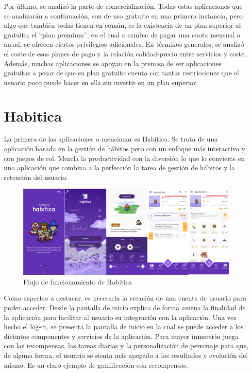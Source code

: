 Por último, se analizó la parte de comercialización. Todas estas aplicaciones que se analizarán a continuación, son de uso gratuito en una primera instancia, pero algo que también todas tienen en común, es la existencia de un plan superior al gratuito, el ``plan premium'',  en el cual a cambio de pagar una cuota mensual o anual, se ofrecen ciertos privilegios adicionales. En términos generales, se analizó el coste de esos planes de pago  y la relación calidad-precio entre servicios y coste. Además, muchas aplicaciones se apoyan en la premisa de ser aplicaciones gratuitas a pesar de que su plan gratuito cuenta con tantas restricciones que el usuario poco puede hacer en ella sin invertir en un plan superior.

\section{Habitica}

La primera de las aplicaciones a mencionar es Habitica. Se trata de una aplicación basada en la gestión de hábitos pero con un enfoque más interactivo y con juegos de rol. Mezcla la productividad con la diversión lo que lo convierte en una aplicación que combina a la perfección la tarea de gestión de hábitos y la retención del usuario.

\begin{figure}[h]
	\centering
	\includegraphics[width = 1\textwidth]{Imagenes/apps_images/habitica.png}
	\caption{Flujo de funcionamiento de Habitica}
	\label{fig:Habitica}
\end{figure}

Como aspectos a destacar, es necesaria la creación de una cuenta de usuario para poder acceder. Desde la pantalla de inicio explica de forma amena la finalidad de la aplicación para facilitar al usuario su integración con la aplicación. Una vez hecho el log-in, se presenta la pantalla de inicio en la cual se puede acceder a los distintos componentes y servicios de la aplicación. Para mayor inmersión juega con las recompensas, las tareas diarias y la personalización de personaje para que, de alguna forma, el usuario se sienta más apegado a los resultados y evolución del mismo. Es un claro ejemplo de gamificación con recompensas.

